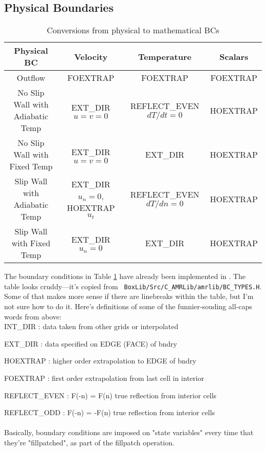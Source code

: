 \subsection{Physical Boundaries}
\begin{table}[h]
\begin{scriptsize}
\begin{center}
\begin{tabular}{|c|c|c|c|} \hline
Physical BC & Velocity & Temperature & Scalars \\
\hline
Outflow & FOEXTRAP & FOEXTRAP & FOEXTRAP \\
No Slip Wall with Adiabatic Temp & EXT\_DIR $u=v=0$ & REFLECT\_EVEN $dT/dt=0$ & HOEXTRAP \\
No Slip Wall with Fixed Temp & EXT\_DIR $u=v=0$ & EXT\_DIR & HOEXTRAP \\
Slip Wall with Adiabatic Temp & EXT\_DIR $u_n=0$, HOEXTRAP $u_t$ & REFLECT\_EVEN $dT/dn=0$ & HOEXTRAP \\
Slip Wall with Fixed Temp & EXT\_DIR $u_n=0$ & EXT\_DIR & HOEXTRAP \\
\hline
\end{tabular}
\end{center}
\caption{Conversions from physical to mathematical BCs}
\label{Table:BC}
\end{scriptsize}
\end{table}
The boundary conditions in Table \ref{Table:BC} have already been
implemented in \castro.  The table looks cruddy---it's copied from {\tt
  BoxLib/Src/C\_AMRLib/amrlib/BC\_TYPES.H}.  Some of that makes more
sense if there are linebreaks within the table, but I'm not sure how
to do it. Here's definitions of some of the funnier-souding all-caps
words from above:\\

INT\_DIR  : data taken from other grids or interpolated

EXT\_DIR  : data specified on EDGE (FACE) of bndry

HOEXTRAP  : higher order extrapolation to EDGE of bndry

FOEXTRAP  : first order extrapolation from last cell in interior

REFLECT\_EVEN : F(-n) = F(n) true reflection from interior cells

REFLECT\_ODD  : F(-n) = -F(n) true reflection from interior cells\\ \\
Basically, boundary conditions are imposed on "state variables" every time that they're "fillpatched", as part of the fillpatch operation.

